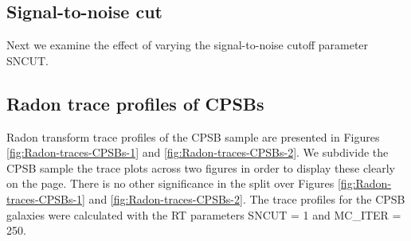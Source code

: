\documentclass[fleqn,usenatbib]{mnras}
\begin{document}
\subsection{Signal-to-noise cut}
\label{SNcut}
Next we examine the effect of varying the signal-to-noise cutoff parameter SNCUT.



\subsection{Radon trace profiles of CPSBs}
\label{sec:Radon_trace_profiles}

Radon transform trace profiles of the CPSB sample are presented in Figures \ref{fig:Radon-traces-CPSBs-1} and \ref{fig:Radon-traces-CPSBs-2}. We subdivide the CPSB sample the trace plots across two figures in order to display these clearly on the page. There is no other significance in the split over Figures \ref{fig:Radon-traces-CPSBs-1} and \ref{fig:Radon-traces-CPSBs-2}. The trace profiles for the CPSB galaxies were calculated with the RT parameters SNCUT = 1 and MC\_ITER = 250.
\end{document}
